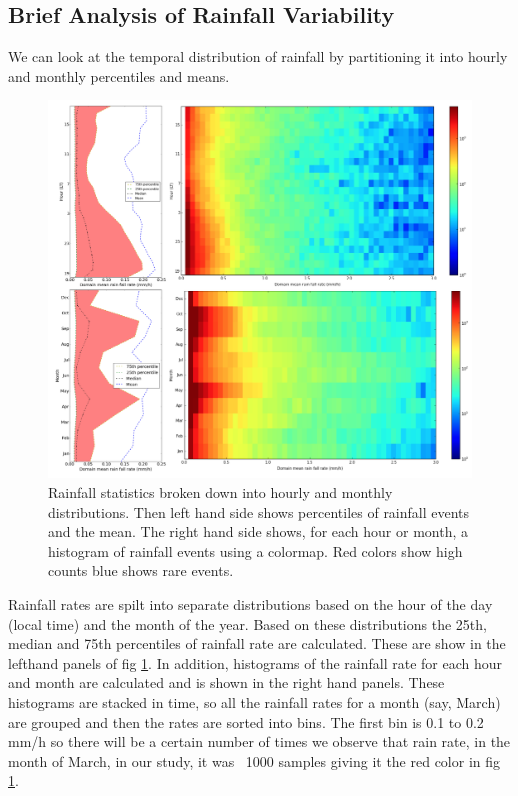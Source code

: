 \documentclass[twocol]{ametsoc}
\begin{document}
\subsection{Brief Analysis of Rainfall Variability}
We can look at the temporal distribution of rainfall by partitioning it into hourly and monthly percentiles and means. 
\begin{figure}
    \centering
    \includegraphics[width=1.0\columnwidth]{var.png}
    \caption{Rainfall statistics broken down into hourly and monthly distributions.  Then left hand side shows percentiles of 
    rainfall events and the mean.  The right hand side shows, for each hour or month, a histogram of rainfall events using a 
    colormap. Red colors show high counts blue shows rare events.}
    \label{fig:var}
\end{figure}
Rainfall rates are spilt into separate distributions based on the hour of the day (local time) and the month of the year. 
Based on these distributions the 25th, median and 75th percentiles of rainfall rate are calculated. These are show in 
the lefthand panels of fig \ref{fig:var}. In addition, histograms of the rainfall rate for each hour and month are calculated 
and is shown in the right hand panels. These histograms are stacked in time, so all the rainfall rates for a month (say, March) 
are grouped and then the rates are sorted into bins. The first bin is 0.1 to 0.2 mm/h so there will be a certain number of times 
we observe that rain rate, in the month of March, in our study, it was ~1000 samples giving it the red color in fig \ref{fig:var}. 
\end{document}
